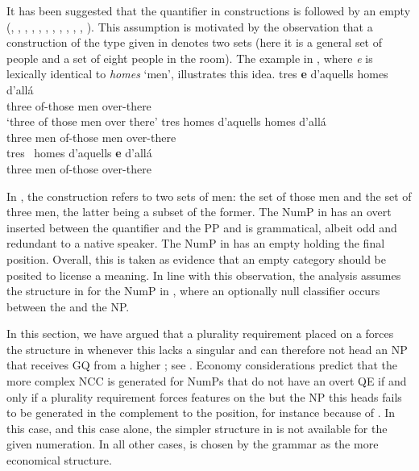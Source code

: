 \documentclass[output=paper,modfonts,newtxmath,hidelinks]{langscibook}
\begin{document}
It has been suggested that the quantifier in  constructions is followed by an empty  (\citealt{Milner1978}, \citealt{Bonet1986}, \citealt{Abney1987}, \citealt{Hernanz-Brucart1987}, \citealt{Delsing1988, Delsing1993}, \citealt{Ramos1992}, \citealt{Cardinaletti-Giusti1992, Cardinaletti-Giusti2006}, \citealt{Sleeman1996}, \citealt{Doetjes1997}, \citealt{Barker1998}, \citealt{Brucart-Rigau2002}, \citealt{Ionin-etal2006}). This assumption is motivated by the observation that a  construction of the type given in  denotes two sets (here it is a general set of people and a set of eight people  in the room). The  example in , where \textit{e} is lexically identical to \textit{homes} ‘men’, illustrates this idea. 
\ea {} \citep[27]{MartiiGirbau2010} \label{18:ex26}
	\ea \label{18:ex26a}
		\gll tres  \textbf{e}  d’aquells  homes     d’allá\\
			 three {} of-those men over-there\\
		\glt `three of those men over there'
	\ex \label{18:ex26b}
		\gll tres homes d’aquells homes d’allá\\
			 three men of-those men over-there\\
    \ex \label{18:ex26c}
		\gll tres~   homes   d’aquells   \textbf{e}   d’allá~ ~\\
			 three men of-those { } over-there\\
	\z
\z

\noindent In , the  construction refers to two sets of men: the set of those men and the set of three men, the latter being a subset of the former. The NumP in  has an overt  inserted between the quantifier and the PP and is grammatical, albeit odd and redundant to a native speaker. The NumP in  has an empty  holding the final  position. Overall, this is taken as evidence that an empty  category should be posited to license a  meaning. In line with this observation, the  analysis assumes the structure in  for the  NumP in , where an optionally null classifier occurs between the  and the  NP. 

In this section, we have argued that a plurality requirement placed on a  forces the structure in  whenever this  lacks a singular  and can therefore not head an NP that receives GQ from a higher ; see . Economy considerations predict that the more complex NCC is generated for NumPs that do not have an overt QE if and only if a plurality requirement forces  features on the  but the NP this  heads fails to be generated in the complement to the  position, for instance because of . In this case, and this case alone, the simpler structure in  is not available for the given numeration. In all other cases,  is chosen by the grammar as the more economical structure.
\end{document}
